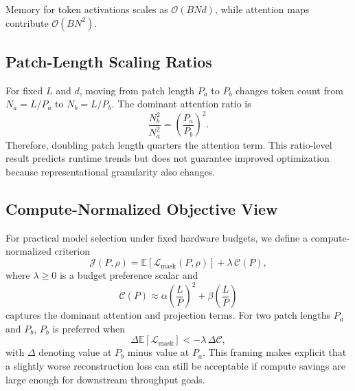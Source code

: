 \documentclass[conference]{IEEEtran}
\begin{document}
Memory for token activations scales as $\mathcal{O}(B N d)$, while attention maps contribute $\mathcal{O}(B N^2)$.

\subsection{Patch-Length Scaling Ratios}
For fixed $L$ and $d$, moving from patch length $P_a$ to $P_b$ changes token count from $N_a=L/P_a$ to $N_b=L/P_b$. The dominant attention ratio is
\begin{equation}
\frac{N_b^2}{N_a^2} = \left(\frac{P_a}{P_b}\right)^2.
\label{eq:ratio}
\end{equation}
Therefore, doubling patch length quarters the attention term. This ratio-level result predicts runtime trends but does not guarantee improved optimization because representational granularity also changes.

\subsection{Compute-Normalized Objective View}
For practical model selection under fixed hardware budgets, we define a compute-normalized criterion
\begin{equation}
\mathcal{J}(P,\rho) = \mathbb{E}[\mathcal{L}_{\text{mask}}(P,\rho)] + \lambda\,\mathcal{C}(P),
\label{eq:compute_obj}
\end{equation}
where $\lambda \ge 0$ is a budget preference scalar and
\begin{equation}
\mathcal{C}(P) \approx \alpha\left(\frac{L}{P}\right)^2 + \beta\left(\frac{L}{P}\right)
\label{eq:compute_cost}
\end{equation}
captures the dominant attention and projection terms. For two patch lengths $P_a$ and $P_b$, $P_b$ is preferred when
\begin{equation}
\Delta \mathbb{E}[\mathcal{L}_{\text{mask}}] < -\lambda\,\Delta\mathcal{C},
\label{eq:tradeoff_rule}
\end{equation}
with $\Delta$ denoting value at $P_b$ minus value at $P_a$. This framing makes explicit that a slightly worse reconstruction loss can still be acceptable if compute savings are large enough for downstream throughput goals.
\end{document}
